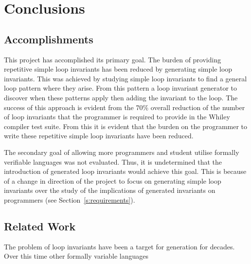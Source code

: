 \chapter{Conclusions}\label{C:con}


\section{Accomplishments}

This project has accomplished its primary goal.
The burden of providing repetitive simple loop invariants has been reduced by generating simple loop invariants.
This was achieved by studying simple loop invariants to find a general loop pattern where they arise.
From this pattern a loop invariant generator to discover when these patterns apply
then adding the invariant to the loop.
The success of this approach is evident from the 70\% overall reduction of the number of loop invariants 
that the programmer is required to provide in the Whiley compiler test suite.
From this it is evident that the burden on the programmer to write
these repetitive simple loop invariants have been reduced.

The secondary goal of allowing more programmers and student utilise formally verifiable
languages was not evaluated.
Thus, it is undetermined that the introduction of generated loop invariants would achieve this goal.
This is because of a change in direction of the project to focus on generating simple loop
invariants over the study of the implications of generated invariants on programmers (see Section~\ref{s:requirements}).

\section{Related Work}

The problem of loop invariants have been a target for generation for decades.
Over this time other formally variable languages

